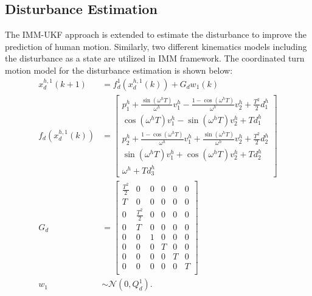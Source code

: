 \documentclass[journal]{IEEEtran}
\begin{document}
	\subsection{Disturbance Estimation}
	The IMM-UKF approach is extended to estimate the disturbance to improve the prediction of human motion. Similarly, two different kinematics models including the disturbance as a state are utilized in IMM framework. The coordinated turn motion model for the disturbance estimation is shown below:
	\begin{subequations}
		\begin{align*}
		x_d^{h,1}(k+1)&= f^1_d(x_d^{h,1}(k))+G_dw_1(k) \\ 
		f_d(x_d^{h,1}(k))&=\left[
		\begin{array}{c}
		p^h_1+\frac{\sin(\omega^h T)}{\omega^h}v^h_1-\frac{1-\cos(\omega^h T)}{\omega^h}v^h_2+\frac{T^2}{2}d^h_1\\
		\cos(\omega^h T)v^h_1-\sin(\omega^h T)v^h_2+Td^h_1\\
		p^h_2+\frac{1-\cos(\omega^h T)}{\omega^h}v^h_1+\frac{\sin(\omega^h T)}{\omega^h}v^h_2+\frac{T^2}{2}d^h_2\\
		\sin(\omega^h T)v^h_1+\cos(\omega^h T)v^h_2+Td^h_2\\
		\omega^h+Td^h_3 
		\end{array}\right] \\
		G_d &= \left[
		\begin{array}{cccccc}
		\frac{T^2}{2}& 0& 0&0 &0 &0\\
		T& 0& 0& 0& 0& 0\\
		0& \frac{T^2}{2}& 0& 0& 0& 0\\
		0& T& 0& 0& 0& 0\\
		0& 0& 1& 0& 0& 0\\ 
		0& 0& 0& T& 0& 0\\
		0& 0& 0& 0& T& 0\\
		0& 0& 0& 0& 0& T\\
		\end{array}\right] \\
		w_1&\sim\mathcal{N}(0,Q^1_d).
		\end{align*}
	\end{subequations}\normalsize
	
\end{document}
